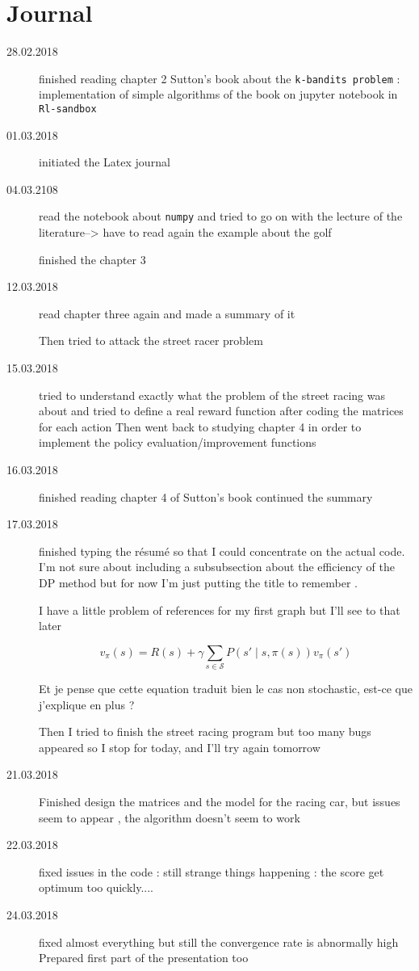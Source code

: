 \documentclass[14pt,a4paper]{article}
\def\code#1{\texttt{#1}}
\theoremstyle{definition}
\begin{document}
\section{Journal}
\begin{description}
\item[28.02.2018] finished reading chapter 2 Sutton's book about the \code{k-bandits problem} : implementation of simple algorithms of the book on jupyter notebook in \code{Rl-sandbox}
\item[01.03.2018] initiated the Latex journal 
\item[04.03.2108]read the notebook about \code{numpy} and tried to go on with the lecture of the literature--> have to read again the example about the golf 

finished the chapter 3 
\item[12.03.2018] read chapter three again and made a summary of it

Then tried to attack the street racer problem 

\item[15.03.2018] tried to understand exactly what the problem of the street racing was about and tried to define a real reward function after coding the matrices for each action
Then went back to studying chapter 4 in order to implement the policy evaluation/improvement functions 

\item[16.03.2018] finished reading chapter 4 of Sutton's book continued the summary
\item[17.03.2018] finished typing the r\'{e}sum\'{e} so that I could concentrate on the actual code. I'm not sure about including a subsubsection about the efficiency of the DP method but for now I'm just putting the title to remember .

I have a little problem of references for my first graph but I'll see to that later 

\begin{equation}
v_{\pi}(s)=R(s)+\gamma \sum_{s \in \mathcal{S}} P(s' \mid s,\pi(s))v_{\pi}(s')
\label{bellman1}
\end{equation}

Et je pense que cette equation traduit  bien le cas non stochastic, est-ce que j'explique en plus ?

Then I tried to finish the street racing program but too many bugs appeared so I stop for today, and I'll try again tomorrow

\item[21.03.2018] Finished design the matrices and the model for the racing car, but issues seem to appear , the algorithm doesn't seem to work

\item[22.03.2018] fixed issues in the code : still strange things happening : the score get optimum too quickly....

\item[24.03.2018] fixed almost everything but still the convergence rate is abnormally high \\ Prepared first part of the presentation too 

\end{description}


\newpage



\end{document}
